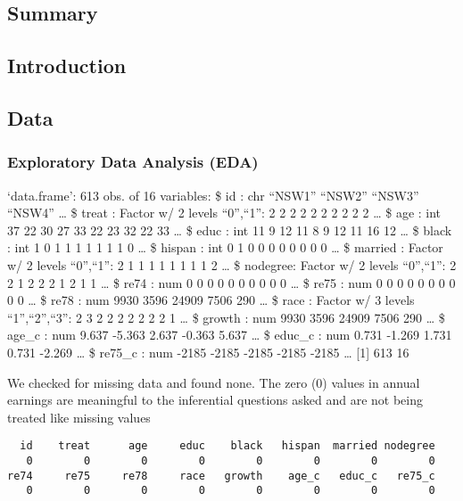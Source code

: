 \documentclass[
]{article}
\author{}
\date{\vspace{-2.5em}}
\begin{document}
\hypertarget{summary}{%
\subsection{Summary}\label{summary}}

\hypertarget{introduction}{%
\subsection{Introduction}\label{introduction}}

\hypertarget{data}{%
\subsection{Data}\label{data}}

\hypertarget{exploratory-data-analysis-eda}{%
\subsubsection{Exploratory Data Analysis
(EDA)}\label{exploratory-data-analysis-eda}}

`data.frame': 613 obs. of 16 variables: \$ id : chr ``NSW1'' ``NSW2''
``NSW3'' ``NSW4'' \ldots{} \$ treat : Factor w/ 2 levels ``0'',``1'': 2
2 2 2 2 2 2 2 2 2 \ldots{} \$ age : int 37 22 30 27 33 22 23 32 22 33
\ldots{} \$ educ : int 11 9 12 11 8 9 12 11 16 12 \ldots{} \$ black :
int 1 0 1 1 1 1 1 1 1 0 \ldots{} \$ hispan : int 0 1 0 0 0 0 0 0 0 0
\ldots{} \$ married : Factor w/ 2 levels ``0'',``1'': 2 1 1 1 1 1 1 1 1
2 \ldots{} \$ nodegree: Factor w/ 2 levels ``0'',``1'': 2 2 1 2 2 2 1 2
1 1 \ldots{} \$ re74 : num 0 0 0 0 0 0 0 0 0 0 \ldots{} \$ re75 : num 0
0 0 0 0 0 0 0 0 0 \ldots{} \$ re78 : num 9930 3596 24909 7506 290
\ldots{} \$ race : Factor w/ 3 levels ``1'',``2'',``3'': 2 3 2 2 2 2 2 2
2 1 \ldots{} \$ growth : num 9930 3596 24909 7506 290 \ldots{} \$ age\_c
: num 9.637 -5.363 2.637 -0.363 5.637 \ldots{} \$ educ\_c : num 0.731
-1.269 1.731 0.731 -2.269 \ldots{} \$ re75\_c : num -2185 -2185 -2185
-2185 -2185 \ldots{} {[}1{]} 613 16

We checked for missing data and found none. The zero (0) values in
annual earnings are meaningful to the inferential questions asked and
are not being treated like missing values

\begin{verbatim}
  id    treat      age     educ    black   hispan  married nodegree 
   0        0        0        0        0        0        0        0 
re74     re75     re78     race   growth    age_c   educ_c   re75_c 
   0        0        0        0        0        0        0        0 
\end{verbatim}
\end{document}
